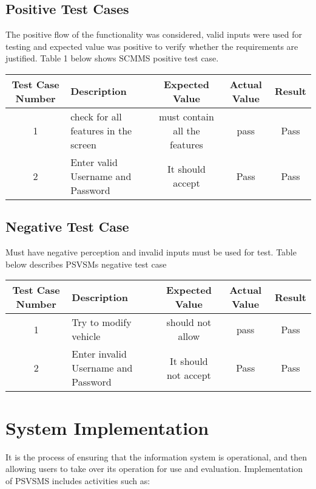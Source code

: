 \documentclass[a4paper, 12pt]{report}
\begin{document}
\subsection{Positive Test Cases}
The positive flow of the functionality was considered, valid inputs were used for testing and expected value was positive to verify whether the requirements are justified. Table 1 below shows SCMMS positive test case.
\begin{center}
\begin{tabular}{|c|p{3cm}|c|c|c|}
\hline
Test Case Number & Description & Expected Value & Actual Value & Result \\
\hline
1 & check for all features in the screen& must contain all the features & pass & Pass \\
2 & Enter valid Username and Password& It should accept & Pass & Pass \\

\hline
\end{tabular}
\end{center}
\par
\clearpage
\subsection{Negative Test Case}
\noindent Must have negative perception and invalid inputs must be used for test.
Table  below describes PSVSMs negative test case\par
\begin{center}
\begin{tabular}{|c|p{3cm}|c|c|c|}
\hline
Test Case Number & Description & Expected Value & Actual Value & Result \\
\hline
1 & Try to modify vehicle& should not allow & pass & Pass \\
2 & Enter invalid Username and Password& It should not accept & Pass & Pass \\

\hline
\end{tabular}
\end{center}

\section{System Implementation}

It is the process of ensuring that the information system is operational, and then allowing users to take over its operation for use and evaluation. Implementation of PSVSMS includes activities such as:
\end{document}
